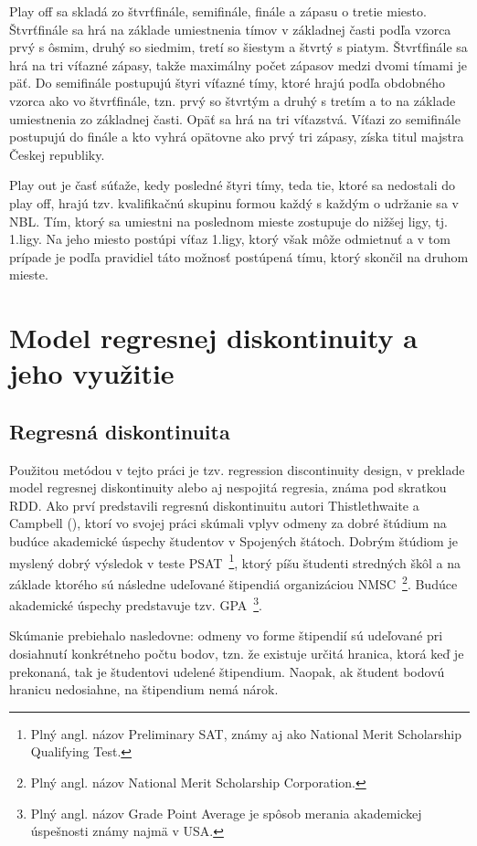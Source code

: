 \documentclass[
  digital, %
  twoside, %
  notable,   %
  lof,     %
  lot,     %
]{fithesis3}
\begin{document}
		Play off sa skladá zo štvrťfinále, semifinále, finále a zápasu o tretie miesto. Štvrťfinále sa hrá na základe umiestnenia tímov v základnej časti podľa vzorca prvý s ôsmim, druhý so siedmim, tretí so šiestym a štvrtý s piatym. Štvrťfinále sa hrá na tri víťazné zápasy, takže maximálny počet zápasov medzi dvomi tímami je päť. Do semifinále postupujú štyri víťazné tímy, ktoré hrajú podľa obdobného vzorca ako vo štvrťfinále, tzn. prvý so štvrtým a druhý s tretím a to na základe umiestnenia zo základnej časti. Opäť sa hrá na tri víťazstvá. Víťazi zo semifinále postupujú do finále a kto vyhrá opätovne ako prvý tri zápasy, získa titul majstra Českej republiky.
		
		Play out je časť súťaže, kedy posledné štyri tímy, teda tie, ktoré sa nedostali do play off, hrajú tzv. kvalifikačnú skupinu formou každý s každým o udržanie sa v NBL. Tím, ktorý sa umiestni na poslednom mieste zostupuje do nižšej ligy, tj. 1.ligy. Na jeho miesto postúpi víťaz 1.ligy, ktorý však môže odmietnuť a v tom prípade je podľa pravidiel táto možnosť postúpená tímu, ktorý skončil na druhom mieste. \parencite{bulletin2018}

	\chapter{Model regresnej diskontinuity a jeho využitie}
		\section{Regresná diskontinuita}
		\label{sec:rdd}
		Použitou metódou v tejto práci je tzv. regression discontinuity design, v preklade model regresnej diskontinuity alebo aj nespojitá regresia, známa pod skratkou RDD. Ako prví predstavili regresnú diskontinuitu autori Thistlethwaite a Campbell (\citeyear{thist1960}), ktorí vo svojej práci skúmali vplyv odmeny za dobré štúdium na budúce akademické úspechy študentov v Spojených štátoch. Dobrým štúdiom je myslený dobrý výsledok v teste PSAT~\footnote{Plný angl. názov Preliminary SAT, známy aj ako National Merit Scholarship Qualifying Test.}, ktorý píšu študenti stredných škôl a na základe ktorého sú následne udeľované štipendiá organizáciou NMSC~\footnote{Plný angl. názov National Merit Scholarship Corporation.}. Budúce akademické úspechy predstavuje tzv. GPA~\footnote{Plný angl. názov Grade Point Average je spôsob merania akademickej úspešnosti známy najmä v USA.}.
	
		Skúmanie prebiehalo nasledovne: odmeny vo forme štipendií sú udeľované pri dosiahnutí konkrétneho počtu bodov, tzn. že existuje určitá hranica, ktorá keď je prekonaná, tak je študentovi udelené štipendium. Naopak, ak študent bodovú hranicu nedosiahne, na štipendium nemá nárok. 
		
\end{document}
